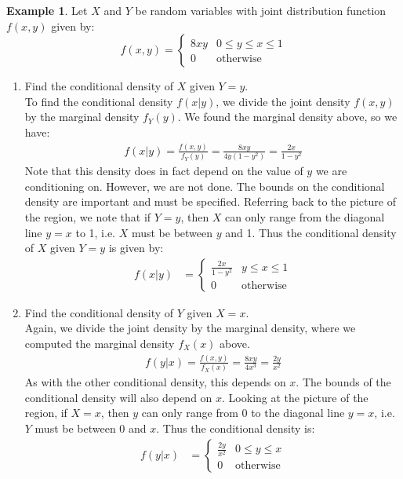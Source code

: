 \documentclass[12pt]{article}
\theoremstyle{definition}
\newtheorem*{example}{Example}
\theoremstyle{remark}
\begin{document}
\begin{example}
Let $X$ and $Y$ be random variables with joint distribution function $f(x, y)$ given by:
\[
f(x, y) = \begin{cases} 
      8 x y  & 0 \leq y \leq x \leq 1 \\
      0 & \textrm{otherwise}
   \end{cases}
\]
\begin{enumerate}

\item Find the conditional density of $X$ given $Y = y$.\\

To find the conditional density $f(x|y)$, we divide the joint density $f(x, y)$ by the marginal density $f_Y(y)$. We found the marginal density above, so we have:
\begin{align*}
f(x|y) = \frac{f(x, y)}{f_Y(y)} = \frac{8 x y}{4y(1 - y^2) } = \frac{2x}{1 - y^2} 
\end{align*}
Note that this density does in fact depend on the value of $y$ we are conditioning on. However, we are not done. The bounds on the conditional density are important and must be specified. Referring back to the picture of the region, we note that if $Y = y$, then $X$ can only range from the diagonal line $y = x$ to 1, i.e. $X$ must be between $y$ and 1. Thus the conditional density of $X$ given $Y = y$ is given by:
\begin{align*}
f(x|y) &=  \begin{cases} 
      \frac{2x}{1 - y^2} & y \leq x \leq 1 \\
      0 & \textrm{otherwise}
   \end{cases}
\end{align*}

\item Find the conditional density of $Y$ given $X = x$.\\

Again, we divide the joint density by the marginal density, where we computed the marginal density $f_X(x)$ above.
\begin{align*}
f(y|x) = \frac{f(x, y)}{f_X(x)} = \frac{8 x y}{4x^3 } = \frac{2y}{x^2}  
\end{align*}
As with the other conditional density, this depends on $x$. The bounds of the conditional density will also depend on $x$. Looking at the picture of the region, if $X = x$, then $y$ can only range from 0 to the diagonal line $y = x$, i.e. $Y$ must be between 0 and $x$. Thus the conditional density is:
\begin{align*}
f(y|x) &=  \begin{cases} 
      \frac{2y}{x^2}  & 0 \leq y \leq x \\
      0 & \textrm{otherwise}
   \end{cases}
\end{align*}


\end{enumerate}
\end{example}
\end{document}
